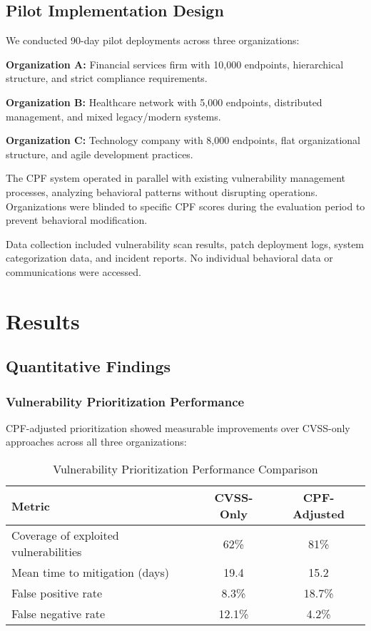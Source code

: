 \documentclass[10pt, twocolumn]{article}
\begin{document}
\subsection{Pilot Implementation Design}

We conducted 90-day pilot deployments across three organizations:

\textbf{Organization A:} Financial services firm with 10,000 endpoints, hierarchical structure, and strict compliance requirements.

\textbf{Organization B:} Healthcare network with 5,000 endpoints, distributed management, and mixed legacy/modern systems.

\textbf{Organization C:} Technology company with 8,000 endpoints, flat organizational structure, and agile development practices.

The CPF system operated in parallel with existing vulnerability management processes, analyzing behavioral patterns without disrupting operations. Organizations were blinded to specific CPF scores during the evaluation period to prevent behavioral modification.

Data collection included vulnerability scan results, patch deployment logs, system categorization data, and incident reports. No individual behavioral data or communications were accessed.

\section{Results}

\subsection{Quantitative Findings}

\subsubsection{Vulnerability Prioritization Performance}

CPF-adjusted prioritization showed measurable improvements over CVSS-only approaches across all three organizations:

\begin{table}[h]
\centering
\caption{Vulnerability Prioritization Performance Comparison}
\label{tab:performance}
\begin{tabular}{lcc}
\toprule
Metric & CVSS-Only & CPF-Adjusted \\
\midrule
Coverage of exploited vulnerabilities & 62\% & 81\% \\
Mean time to mitigation (days) & 19.4 & 15.2 \\
False positive rate & 8.3\% & 18.7\% \\
False negative rate & 12.1\% & 4.2\% \\
\bottomrule
\end{tabular}
\end{table}
\end{document}
